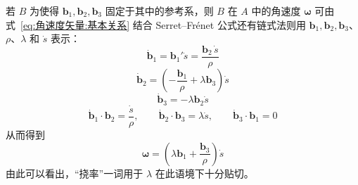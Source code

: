 \begin{example}
    若 $B$ 为使得 $\mathbf{b}_1,\mathbf{b}_2,\mathbf{b}_3$ 固定于其中的参考系，则 $B$ 在 $A$ 中的角速度 $\bm{\omega}$ 可由式~\eqref{eq:角速度矢量:基本关系} 结合 Serret--Frénet 公式还有链式法则用 $\mathbf{b}_1,\mathbf{b}_2,\mathbf{b}_3$、$\rho$、$\lambda$ 和 $\dot{s}$ 表示：
    \begin{equation}
        \dot{\mathbf{b}}_1 = \mathbf{b}_1'\dot{s} = \frac{\mathbf{b}_2\,\dot{s}}{\rho}
    \end{equation}
    \begin{equation}
        \dot{\mathbf{b}}_2 = \left(-\frac{\mathbf{b}_1}{\rho} + \lambda\mathbf{b}_3\right)\dot{s}
    \end{equation}
    \begin{equation}
        \dot{\mathbf{b}}_3 = -\lambda\mathbf{b}_2\dot{s}
    \end{equation}
    \begin{equation}
        \dot{\mathbf{b}}_1\cdot\mathbf{b}_2 = \frac{\dot{s}}{\rho},\qquad
        \dot{\mathbf{b}}_2\cdot\mathbf{b}_3 = \lambda\dot{s},\qquad
        \dot{\mathbf{b}}_3\cdot\mathbf{b}_1 = 0
    \end{equation}
    从而得到
    \begin{equation}
        \bm{\omega} = \left(\lambda\mathbf{b}_1 + \frac{\mathbf{b}_3}{\rho}\right)\dot{s}
        \label{eq:角速度矢量:SerretFrenet角速度}
    \end{equation}
    由此可以看出，“挠率”一词用于 $\lambda$ 在此语境下十分贴切。


\end{example}

